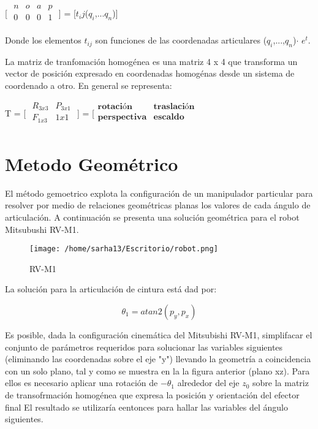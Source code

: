 \documentclass[letter,openright,12pt,spanish]{report}
\begin{document}
\begin{center}
[
$\begin{matrix}
	n & o & a & p\\
	0 & 0 & 0 & 1\\
\end{matrix}$ ] = [$t_ij$($q_i$,...$q_n$)]
\end{center}

Donde los elementos $t_{ij}$ son funciones de las coordenadas articulares ($q_i$,...,$q_n$)$\cdot $ $e^t$.

La matriz de tranfomaci\'on homog\'enea es una matriz 4 x 4 que transforma un vector de posici\'on expresado en coordenadas homog\'enas desde un sistema de coordenado a otro. En general se representa:

\begin{center}
T = [ $\begin{matrix}
	R_{3x3} & P_{3x1}\\
	F_{1x3} & 1x1\\
\end{matrix}$ ] = [$\begin{matrix}
	\textbf{rotaci\'on} & \textbf{traslaci\'on}\\
	\textbf{perspectiva} & \textbf{escaldo}\\
\end{matrix}$
\end{center}

\section{Metodo Geom\'etrico}

El m\'etodo gemoetrico explota la configuraci\'on de un manipulador particular para resolver por medio de relaciones geom\'etricas planas los valores de cada \'angulo de articulaci\'on. A continuaci\'on se presenta una soluci\'on geom\'etrica para el robot Mitsubushi RV-M1.

\begin{figure}[htp]
\centering
\texttt{[image: /home/sarha13/Escritorio/robot.png]}
\caption{RV-M1}
\label{Figura 1}
\end{figure}

La soluci\'on para la articulaci\'on de cintura est\'a dad por:

\begin{displaymath}
\theta_1=atan2(p_y,p_x)
\end{displaymath}

Es posible, dada la configuraci\'on cinem\'atica del Mitsubishi RV-M1, simplifacar el conjunto de par\'ametros requeridos para solucionar las variables siguientes (eliminando las coordenadas sobre el eje "y") llevando la geometr\'ia a coincidencia con un solo plano, tal y como se muestra en la la figura anterior (plano xz). Para ellos es necesario aplicar una rotaci\'on de $-\theta_1$ alrededor del eje $z_0$ sobre la matriz de transofrmaci\'on homog\'enea que expresa la posici\'on y orientaci\'on del efector final El resultado se utilizar\'ia eentonces para hallar las variables del \'angulo siguientes.
\end{document}

